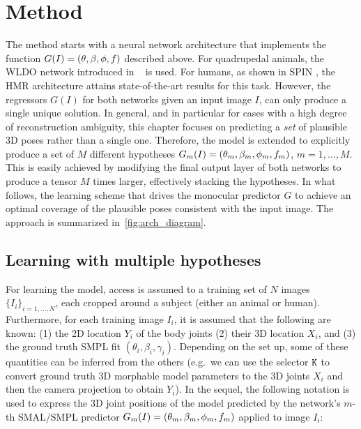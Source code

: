 \section{Method}\label{s:method}


The method starts with a neural network architecture that implements the function $G(I) = (\theta, \beta, \phi, f)$ described above.
For quadrupedal animals, the WLDO network introduced in ~ is used. For humans, as shown in SPIN \cite{kolotouros19learning}, the HMR \cite{kanazawa18end-to-end} architecture attains state-of-the-art results for this task.
However, the regressors $G(I)$ for both networks given an input image $I$, can only produce a single unique solution.
In general, and in particular for cases with a high degree of reconstruction ambiguity, this chapter focuses on predicting a \emph{set} of plausible 3D poses rather than a single one.
%
Therefore, the model is extended to explicitly produce a set of $M$ different hypotheses $G_m (I) = (\theta_m, \beta_m, \phi_m, f_m)$, $m=1,\dots,M$.
This is easily achieved by modifying the final output layer of both networks to produce a tensor $M$ times larger, effectively stacking the hypotheses.
In what follows, the learning scheme that drives the monocular predictor $G$ to achieve an optimal coverage of the plausible poses consistent with the input image. The approach is summarized in~\cref{fig:arch_diagram}. 

\subsection{Learning with multiple hypotheses}

For learning the model, access is assumed to a training set of $N$ images $\{I_i\}_{i =1,\dots,N}$, each cropped around a subject (either an animal or human).
Furthermore, for each training image $I_i$, it is assumed that the following are known: (1) the 2D location $Y_i$ of the body joints (2) their 3D location $X_i$, and (3) the ground truth SMPL fit $(\theta_i, \beta_i, \gamma_i)$.
Depending on the set up, some of these quantities can be inferred from the others (e.g.~we can use the selector $\mathtt{K}$ to convert ground truth 3D morphable model parameters to the 3D joints $X_i$ and then the camera projection to obtain $Y_i$).
In the sequel, the following notation is used to express the 3D joint positions of the model predicted by the network's $m$-th SMAL/SMPL predictor $G_m (I) = (\theta_m, \beta_m, \phi_m, f_m)$ applied to image $I_{i}$:

